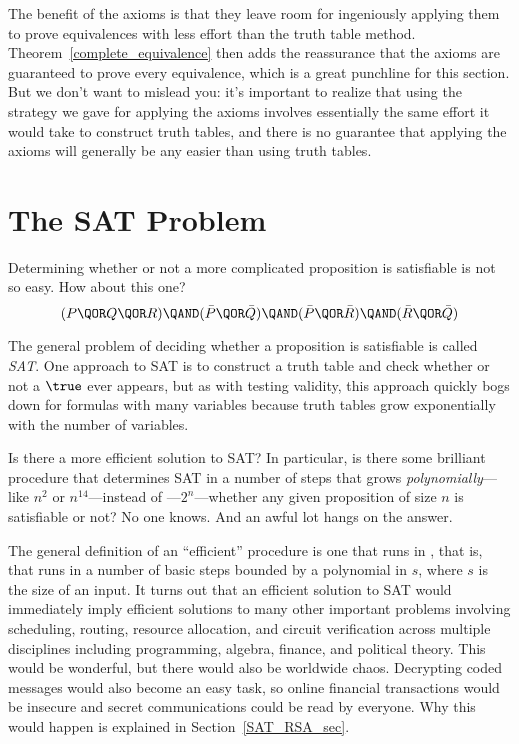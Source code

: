 The benefit of the axioms is that they leave room for ingeniously
applying them to prove equivalences with less effort than the truth
table method.  Theorem~\ref{complete_equivalence} then adds the
reassurance that the axioms are guaranteed to prove every equivalence,
which is a great punchline for this section.  But we don't want to
mislead you: it's important to realize that using the strategy we gave
for applying the axioms involves essentially the same effort it would
take to construct truth tables, and there is no guarantee that applying the
axioms will generally be any easier than using truth tables.

\begin{problems}
\practiceproblems
{}

\classproblems
{}

\homeworkproblems
{}

\end{problems}

\section{The SAT Problem}\label{SAT_sec}
Determining whether or not a more complicated proposition is
satisfiable is not so easy.  How about this one?
%
\[
(P \QOR Q \QOR R) \QAND (\bar P \QOR \bar Q)
                  \QAND (\bar P \QOR \bar R)
                  \QAND (\bar R \QOR \bar Q)
\]

The general problem of deciding whether a proposition is
satisfiable is called%
\emph{SAT}.  One approach to SAT is to construct a truth table 
and check whether or not a $\true$ ever
appears, but as with testing validity, this approach quickly bogs down
for formulas with many variables because truth tables grow
exponentially with the number of variables.

Is there a more efficient solution to SAT?  In particular, is
there some brilliant procedure that determines SAT in a number of steps
that grows \emph{polynomially}---like
$n^2$ or $n^{14}$---instead of \emph{}---$2^n$---whether any given proposition of size
$n$ is satisfiable or not?  No one knows.  And an awful lot hangs on
the answer.

The general definition of an ``efficient'' procedure is one that runs
in , that is, that runs in a number of basic
steps bounded by a polynomial in $s$, where $s$ is the size of an
input.  It turns out that an efficient solution to SAT would
immediately imply efficient solutions to many other important problems
involving scheduling, routing, resource allocation, and circuit
verification across multiple disciplines including programming,
algebra, finance, and political theory.  This would
be wonderful, but there would also be worldwide chaos.  Decrypting
coded messages would also become an easy task, so online financial
transactions would be insecure and secret communications could be read
by everyone.  Why this would happen is explained in
Section~\ref{SAT_RSA_sec}.

